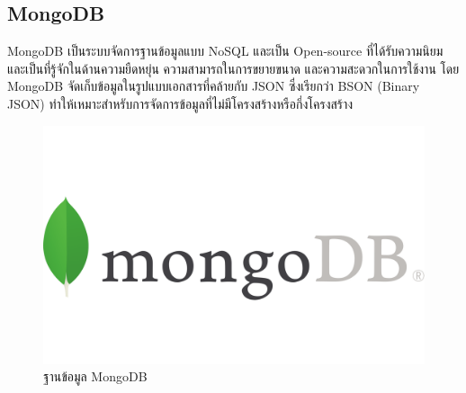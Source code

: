 \subsection{MongoDB}
MongoDB เป็นระบบจัดการฐานข้อมูลแบบ NoSQL และเป็น Open-source ที่ได้รับความนิยมและเป็นที่รู้จักในด้านความยืดหยุ่น ความสามารถในการขยายขนาด และความสะดวกในการใช้งาน โดย MongoDB จัดเก็บข้อมูลในรูปแบบเอกสารที่คล้ายกับ JSON ซึ่งเรียกว่า BSON (Binary JSON) ทำให้เหมาะสำหรับการจัดการข้อมูลที่ไม่มีโครงสร้างหรือกึ่งโครงสร้าง
\begin{figure}[ht]
  \centering
  \includegraphics[scale=0.025]{images/tech/mongodb.png}
  \caption{ฐานข้อมูล MongoDB}
  \label{fig:mongodb}
\end{figure}
\FloatBarrier

\newpage

